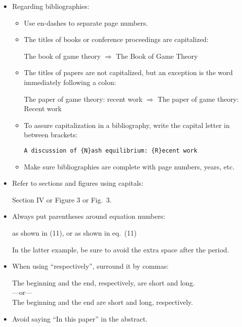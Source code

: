 \documentclass[11pt]{article}
\begin{document}
\begin{itemize}
\item Regarding bibliographies:
\begin{itemize}
\item Use en-dashes to separate page numbers.
\item The titles of books or conference proceedings are capitalized:
\begin{center}
The book of game theory $\Rightarrow$ The Book of Game Theory
\end{center}
\item The titles of papers are not capitalized, but an exception is the word immediately following a colon:
\begin{center}
The paper of game theory: recent work $\Rightarrow$ The paper of game theory: Recent work
\end{center}
\item To assure capitalization in a bibliography, write the capital letter in between brackets:
\begin{center}
\texttt{A discussion of \{N\}ash equilibrium: \{R\}ecent work}
\end{center}
\item Make sure bibliographies are complete with page numbers, years, etc.

\end{itemize}

\item Refer to sections and figures using capitals:
\begin{center}
Section IV or Figure 3 or Fig.\ 3.
\end{center}

\item Always put parentheses around equation numbers:
\begin{center}
as shown in  (11), or as shown in eq.\ (11)
\end{center}
In the latter example, be sure to avoid the extra space after the period.

\item When using ``respectively'', surround it by commas:
\begin{center}
The beginning and the end, respectively, are short and long.\\
---or---\\
The beginning and the end are short and long, respectively.
\end{center}

\item Avoid saying ``In this paper'' in the abstract.


\end{itemize}
\end{document}
